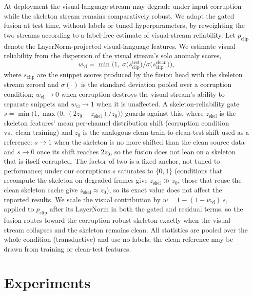 \documentclass[sigconf]{acmart}
\begin{document}
At deployment the visual-language stream may degrade under input corruption while the skeleton stream remains comparatively robust. We adapt the gated fusion at test time, without labels or tuned hyperparameters, by reweighting the two streams according to a label-free estimate of visual-stream reliability. Let $p_{\mathrm{clip}}$ denote the LayerNorm-projected visual-language features. We estimate visual reliability from the dispersion of the visual stream's solo anomaly scores,
\begin{equation}
w_{\mathrm{vl}} = \min\!\Big(1,\ \sigma\big(s_{\mathrm{clip}}^{\mathrm{test}}\big) \big/ \sigma\big(s_{\mathrm{clip}}^{\mathrm{clean}}\big)\Big),
\end{equation}
where $s_{\mathrm{clip}}$ are the snippet scores produced by the fusion head with the skeleton stream zeroed and $\sigma(\cdot)$ is the standard deviation pooled over a corruption condition; $w_{\mathrm{vl}}\!\to\!0$ when corruption destroys the visual stream's ability to separate snippets and $w_{\mathrm{vl}}\!\to\!1$ when it is unaffected. A skeleton-reliability gate $s = \min\!\big(1, \max\big(0,\, (2 z_0 - z_{\mathrm{skel}})/z_0\big)\big)$ guards against this, where $z_{\mathrm{skel}}$ is the skeleton features' mean per-channel distribution shift (corruption condition vs.\ clean training) and $z_0$ is the analogous clean-train-to-clean-test shift used as a reference: $s\!\to\!1$ when the skeleton is no more shifted than the clean source data and $s\!\to\!0$ once its shift reaches $2 z_0$, so the fusion does not lean on a skeleton that is itself corrupted. The factor of two is a fixed anchor, not tuned to performance; under our corruptions $s$ saturates to $\{0,1\}$ (conditions that recompute the skeleton on degraded frames give $z_{\mathrm{skel}}\!\gg\!z_0$, those that reuse the clean skeleton cache give $z_{\mathrm{skel}}\!\approx\!z_0$), so its exact value does not affect the reported results. We scale the visual contribution by $w = 1-(1-w_{\mathrm{vl}})\,s$, applied to $p_{\mathrm{clip}}$ after its LayerNorm in both the gated and residual terms, so the fusion routes toward the corruption-robust skeleton exactly when the visual stream collapses and the skeleton remains clean. All statistics are pooled over the whole condition (transductive) and use no labels; the clean reference may be drawn from training or clean-test features.

\section{Experiments}
\end{document}
